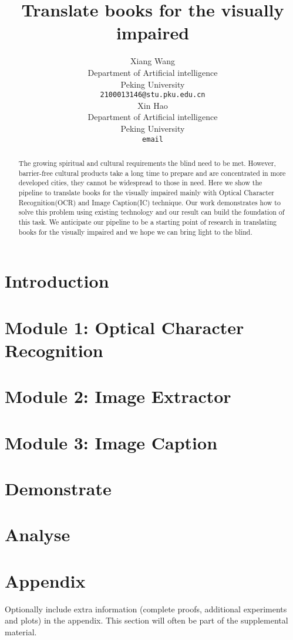 \documentclass{article}
\title{Translate books for the visually impaired}
\author{
  Xiang Wang\\
  Department of Artificial intelligence\\
  Peking University\\
  \texttt{2100013146@stu.pku.edu.cn} \\
  \And
  Xin Hao \\
  Department of Artificial intelligence\\
  Peking University\\
  \texttt{email} \\
}
\begin{document}
\maketitle

\begin{abstract}
  The growing spiritual and cultural requirements the blind need to be met. 
  However, barrier-free cultural products take a long time to prepare and are concentrated in more developed cities, they cannot be widespread to those in need. 
  Here we show the pipeline to translate books for the visually impaired mainly with Optical Character Recognition(OCR) and Image Caption(IC) technique. 
  Our work demonstrates how to solve this problem using existing technology and our result can build the foundation of this task. 
  We anticipate our pipeline to be a starting point of research in translating books for the visually impaired and we hope we can bring light to the blind. 
\end{abstract}

\section{Introduction}
\section{Module 1: Optical Character Recognition}
\section{Module 2: Image Extractor}
\section{Module 3: Image Caption}
\section{Demonstrate}
\section{Analyse}





\appendix

\section{Appendix}

Optionally include extra information (complete proofs, additional experiments and plots) in the appendix. This section will often be part of the supplemental material.
\end{document}
